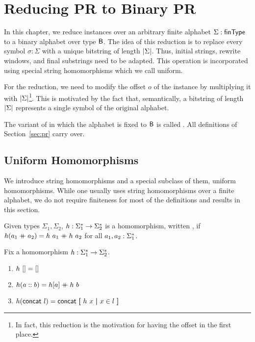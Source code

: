 \newcommand{\strentD}[1]{\ensuremath{\rightsquigarrow^D}}
\newcommand{\FlatPR}{\textbf{FlatPR}}

\chapter{Reducing PR to Binary PR}\label{chap:pr_bpr}
In this chapter, we reduce \PR{} instances over an arbitrary finite alphabet $\Sigma : \textsf{finType}$ to a binary alphabet over type $\textsf{B}$. The idea of this reduction is to replace every symbol $\sigma : \Sigma$ with a unique bitstring of length $|\Sigma|$. 
Thus, initial strings, rewrite windows, and final substrings need to be adapted.
This operation is incorporated using special string homomorphisms which we call uniform.

For the reduction, we need to modify the offset $o$ of the \PR{} instance by multiplying it with $|\Sigma|$\footnote{In fact, this reduction is the motivation for having the offset in the first place.}. This is motivated by the fact that, semantically, a bitstring of length $|\Sigma|$ represents a single symbol of the original alphabet.

The variant of \PR{} in which the alphabet is fixed to $\textsf{B}$ is called \BPR{}. All definitions of Section~\ref{sec:pr} carry over.

\section{Uniform Homomorphisms}
We introduce string homomorphisms and a special subclass of them, uniform homomorphisms.
While one usually uses string homomorphisms over a finite alphabet, we do not require finiteness for most of the definitions and results in this section.

\newcommand{\homomorphism}{\textsf{homomorphism}}
\begin{definition}
  Given types $\Sigma_1, \Sigma_2$, $h : \Sigma_1^* \rightarrow \Sigma_2^*$ is a homomorphism, written \mnotec{$\homomorphism~h$}, if $h (a_1 \mathbin{+\mkern-10mu+} a_2) = h~a_1 \mathbin{+\mkern-10mu+} h~a_2$ for all $a_1, a_2 : \Sigma_1^*$. 
\end{definition}

\begin{fact}
  Fix a homomorphism $h : \Sigma_1^* \rightarrow \Sigma_2^*$. 
  \begin{enumerate}
    \item $h~[] = []$
    \item $h (a :: b) = h [a] \mathbin{+\mkern-10mu+} h~b$
    \item $h (\textsf{concat}~l) = \textsf{concat}~\textbf{[}~ h~x ~\textbf{|}~ x \in l ~\textbf{]}$
  \end{enumerate}
\end{fact}

